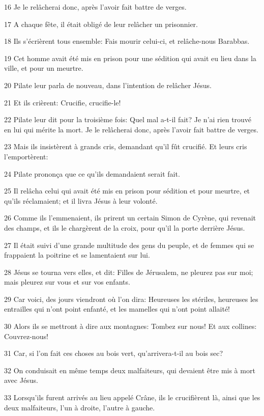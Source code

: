 \par 16 Je le relâcherai donc, après l'avoir fait battre de verges.
\par 17 A chaque fête, il était obligé de leur relâcher un prisonnier.
\par 18 Ils s'écrièrent tous ensemble: Fais mourir celui-ci, et relâche-nous Barabbas.
\par 19 Cet homme avait été mis en prison pour une sédition qui avait eu lieu dans la ville, et pour un meurtre.
\par 20 Pilate leur parla de nouveau, dans l'intention de relâcher Jésus.
\par 21 Et ils crièrent: Crucifie, crucifie-le!
\par 22 Pilate leur dit pour la troisième fois: Quel mal a-t-il fait? Je n'ai rien trouvé en lui qui mérite la mort. Je le relâcherai donc, après l'avoir fait battre de verges.
\par 23 Mais ils insistèrent à grands cris, demandant qu'il fût crucifié. Et leurs cris l'emportèrent:
\par 24 Pilate prononça que ce qu'ils demandaient serait fait.
\par 25 Il relâcha celui qui avait été mis en prison pour sédition et pour meurtre, et qu'ils réclamaient; et il livra Jésus à leur volonté.
\par 26 Comme ils l'emmenaient, ils prirent un certain Simon de Cyrène, qui revenait des champs, et ils le chargèrent de la croix, pour qu'il la porte derrière Jésus.
\par 27 Il était suivi d'une grande multitude des gens du peuple, et de femmes qui se frappaient la poitrine et se lamentaient sur lui.
\par 28 Jésus se tourna vers elles, et dit: Filles de Jérusalem, ne pleurez pas sur moi; mais pleurez sur vous et sur vos enfants.
\par 29 Car voici, des jours viendront où l'on dira: Heureuses les stériles, heureuses les entrailles qui n'ont point enfanté, et les mamelles qui n'ont point allaité!
\par 30 Alors ils se mettront à dire aux montagnes: Tombez sur nous! Et aux collines: Couvrez-nous!
\par 31 Car, si l'on fait ces choses au bois vert, qu'arrivera-t-il au bois sec?
\par 32 On conduisait en même temps deux malfaiteurs, qui devaient être mis à mort avec Jésus.
\par 33 Lorsqu'ils furent arrivés au lieu appelé Crâne, ils le crucifièrent là, ainsi que les deux malfaiteurs, l'un à droite, l'autre à gauche.

